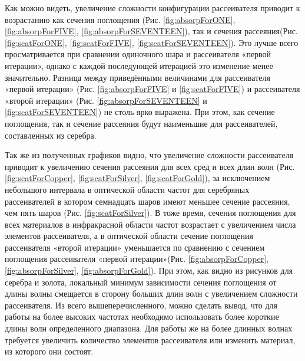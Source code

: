 Как можно видеть, увеличение сложности конфигурации рассеивателя приводит к возрастанию как сечения поглощения (Рис. \ref{fig:absorpForONE}, \ref{fig:absorpForFIVE}, \ref{fig:absorpForSEVENTEEN}), так и сечения рассеяния(Рис. \ref{fig:scatForONE}, \ref{fig:scatForFIVE}, \ref{fig:scatForSEVENTEEN}). Это лучше всего
просматривается при сравнении одиночного шара и рассеивателя «первой итерации», однако с каждой последующей итерацией это изменение менее значительно. Разница между приведёнными величинами для рассеивателя «первой итерации» (Рис. \ref{fig:absorpForFIVE} и \ref{fig:scatForFIVE}) и рассеивателя «второй итерации» (Рис. \ref{fig:absorpForSEVENTEEN} и \ref{fig:scatForSEVENTEEN}) не столь ярко выражена. При этом, как сечение поглощения, так и сечение рассеяния будут наименьшие для рассеивателей, составленных из серебра.
 
Так же из полученных графиков видно, что увеличение сложности рассеивателя приводит к увеличению сечения рассеяния для всех сред и всех длин волн (Рис. \ref{fig:scatForCopper}, \ref{fig:scatForSilver}, \ref{fig:scatForGold}), за исключением небольшого интервала в оптической области частот для серебряных рассеивателей в котором семнадцать шаров имеют меньшее сечение рассеяния, чем пять шаров (Рис. \ref{fig:scatForSilver}). В тоже время, сечения поглощения для всех материалов в инфракрасной области частот возрастает с увеличением числа элементов рассеивателя, а в оптической области сечение поглощения рассеивателя «второй итерации» уменьшается по сравнению с сечением поглощения рассеивателя «первой итерации»(Рис. \ref{fig:absorpForCopper}, \ref{fig:absorpForSilver}, \ref{fig:absorpForGold}).
При этом, как видно из рисунков для серебра и золота, локальный минимум зависимости сечения поглощения от длины волны смещается в сторону больших длин волн с увеличением сложности рассеивателя.
Из всего вышеперечисленного, можно сделать вывод, что для работы на более высоких частотах необходимо использовать более короткие длины волн определенного диапазона. Для работы же на более длинных волнах требуется увеличить количество элементов рассеивателя или изменить материал, из которого они состоят.

